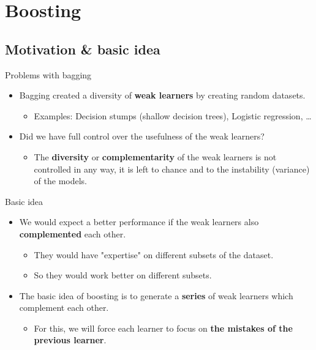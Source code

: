\documentclass[serif, aspectratio=169]{beamer}
\begin{document}
\section{Boosting}

\subsection{Motivation \& basic idea}

\begin{frame}{Problems with bagging}
    \begin{itemize}
        \itemsep1em
        \justifying
        \item Bagging created a diversity of \textbf{weak learners} by creating random datasets.
        \begin{itemize}
            \item Examples: Decision stumps (shallow decision trees), Logistic regression, \dots
        \end{itemize}
        \item Did we have full control over the usefulness of the weak learners?
        \begin{itemize}
            \item The \textbf{diversity} or \textbf{complementarity} of the weak learners is not controlled in any way, it is left to chance and to the instability (variance) of the models.
        \end{itemize}
    \end{itemize}
\end{frame}

\begin{frame}{Basic idea}
    \begin{itemize}
        \itemsep1em
        \justifying
        \item We would expect a better performance if the weak learners also \textbf{complemented} each other.
        \begin{itemize}
            \itemsep0.25em
            \item They would have "expertise" on different subsets of the dataset.
            \item So they would work better on different subsets.
        \end{itemize}
        \item The basic idea of boosting is to generate a \textbf{series} of weak learners which complement each other.
        \begin{itemize}
            \item For this, we will force each learner to focus on \textbf{the mistakes of the previous learner}.
        \end{itemize}
    \end{itemize}
\end{frame}
\end{document}
